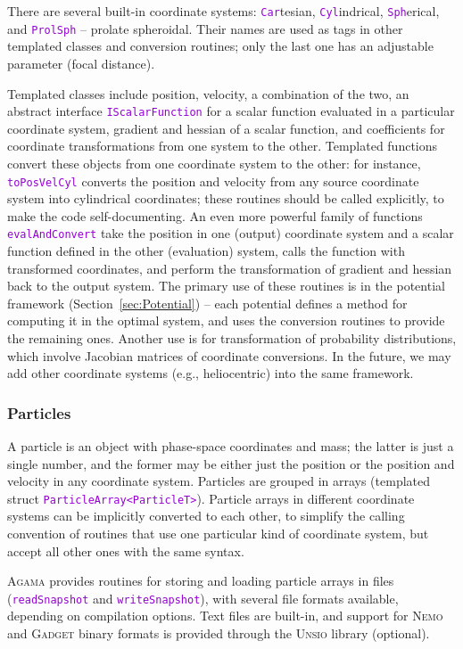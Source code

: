 \documentclass[12pt]{article}
\newcommand{\Agama}{\textsc{Agama}\xspace}
\newcommand{\Nemo} {\textsc{Nemo}\xspace}
\newcommand{\ttt}[1]{\textcolor{darkviolet}{\texttt{#1}}}
\begin{document}
There are several built-in coordinate systems: \ttt{Car}tesian, \ttt{Cyl}indrical, \ttt{Sph}erical, and \ttt{ProlSph} -- prolate spheroidal. Their names are used as tags in other templated classes and conversion routines; only the last one has an adjustable parameter (focal distance).

Templated classes include position, velocity, a combination of the two, an abstract interface \ttt{IScalarFunction} for a scalar function evaluated in a particular coordinate system, gradient and hessian of a scalar function, and coefficients for coordinate transformations from one system to the other. Templated functions convert these objects from one coordinate system to the other: for instance, \ttt{toPosVelCyl} converts the position and velocity from any source coordinate system into cylindrical coordinates; these routines should be called explicitly, to make the code self-documenting. An even more powerful family of functions \ttt{evalAndConvert} take the position in one (output) coordinate system and a scalar function defined in the other (evaluation) system, calls the function with transformed coordinates, and perform the transformation of gradient and hessian back to the output system. The primary use of these routines is in the potential framework (Section~\ref{sec:Potential}) -- each potential defines a method for computing it in the optimal system, and uses the conversion routines to provide the remaining ones. Another use is for transformation of probability distributions, which involve Jacobian matrices of coordinate conversions. In the future, we may add other coordinate systems (e.g., heliocentric) into the same framework.

\subsubsection{Particles}  \label{sec:Particles}
A particle is an object with phase-space coordinates and mass; the latter is just a single number, and the former may be either just the position or the position and velocity in any coordinate system. Particles are grouped in arrays (templated struct \ttt{ParticleArray<ParticleT>}).
Particle arrays in different coordinate systems can be implicitly converted to each other, to simplify the calling convention of routines that use one particular kind of coordinate system, but accept all other ones with the same syntax.

\Agama provides routines for storing and loading particle arrays in files (\ttt{readSnapshot} and \ttt{writeSnapshot}), with several file formats available, depending on compilation options. Text files are built-in, and support for \Nemo and \textsc{Gadget} binary formats is provided through the \textsc{Unsio} library (optional).
\end{document}
